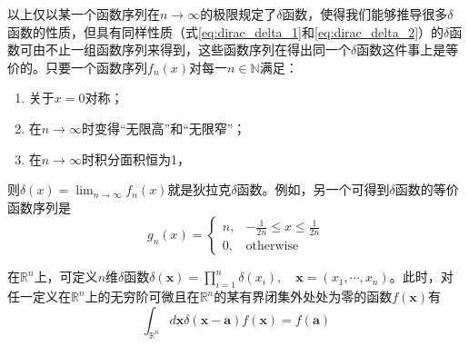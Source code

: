 \documentclass[main.tex]{subfiles}
\begin{document}
以上仅以某一个函数序列在$n\rightarrow\infty$的极限规定了$\delta$函数，使得我们能够推导很多$\delta$函数的性质，但具有同样性质（式\eqref{eq:dirac_delta_1}和\eqref{eq:dirac_delta_2}）的$\delta$函数可由不止一组函数序列来得到，这些函数序列在得出同一个$\delta$函数这件事上是等价的。只要一个函数序列$f_n\left(x\right)$对每一$n\in\mathbb{N}$满足：
\begin{enumerate}
    \item 关于$x=0$对称；
    \item 在$n\rightarrow\infty$时变得“无限高”和“无限窄”；
    \item 在$n\rightarrow\infty$时积分面积恒为1，
\end{enumerate}
则$\delta\left(x\right)=\lim_{n\to\infty}f_n\left(x\right)$就是狄拉克$\delta$函数。例如，另一个可得到$\delta$函数的等价函数序列是
\[
    g_n\left(x\right)=\left\{\begin{array}{ll}
        n, & -\frac{1}{2n}\leq x\leq\frac{1}{2n} \\
        0, & \text{otherwise}\end{array}\right.
\]

在$\mathbb{R}^n$上，可定义$n$维$\delta$函数$\delta\left(\mathbf{x}\right)=\prod_{i=1}^n\delta\left(x_i\right),\quad \mathbf{x}=\left(x_1,\cdots,x_n\right)$。此时，对任一定义在$\mathbb{R}^n$上的无穷阶可微且在$\mathbb{R}^n$的某有界闭集外处处为零的函数$f\left(\mathbf{x}\right)$有
\begin{equation}\label{eq:dirac_delta_3}
    \int_{\mathbb{R}^n}d\mathbf{x}\delta\left(\mathbf{x}-\mathbf{a}\right)f\left(\mathbf{x}\right)=f\left(\mathbf{a}\right)
\end{equation}

\end{document}
